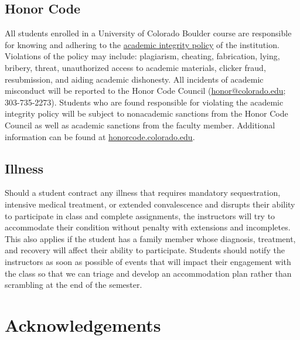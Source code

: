 \documentclass[10pt]{memoir}
\begin{document}
\subsection{Honor Code}
All students enrolled in a University of Colorado Boulder course are responsible for knowing and adhering to the \href{http://www.colorado.edu/policies/academic-integrity-policy}{academic integrity policy} of the institution. Violations of the policy may include: plagiarism, cheating, fabrication, lying, bribery, threat, unauthorized access to academic materials, clicker fraud, resubmission, and aiding academic dishonesty. All incidents of academic misconduct will be reported to the Honor Code Council (\href{mailto:honor@colorado.edu}{honor@colorado.edu}; 303-735-2273). Students who are found responsible for violating the academic integrity policy will be subject to nonacademic sanctions from the Honor Code Council as well as academic sanctions from the faculty member. Additional information can be found at \href{http://honorcode.colorado.edu}{honorcode.colorado.edu}. 

\subsection{Illness}
Should a student contract any illness that requires mandatory sequestration, intensive medical treatment, or extended convalescence and disrupts their ability to participate in class and complete assignments, the instructors will try to accommodate their condition without penalty with extensions and incompletes. This also applies if the student has a family member whose diagnosis, treatment, and recovery will affect their ability to participate. Students should notify the instructors as soon as possible of events that will impact their engagement with the class so that we can triage and develop an accommodation plan rather than scrambling at the end of the semester.

\section{\textbf{Acknowledgements}}
\end{document}

